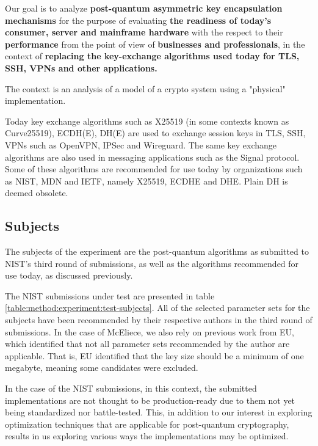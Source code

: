 Our goal is to analyze \textbf{post-quantum asymmetric key encapsulation mechanisms} for the purpose of evaluating \textbf{the readiness of today's consumer, server and mainframe hardware} with the respect to their \textbf{performance} from the point of view of \textbf{businesses and professionals}, in the context of \textbf{replacing the key-exchange algorithms used today for TLS, SSH, VPNs and other applications.}

The context is an analysis of a model of a crypto system using a "physical" implementation.

Today key exchange algorithms such as X25519 (in some contexts known as Curve25519), ECDH(E), DH(E) are used to exchange session keys in TLS, SSH, VPNs such as OpenVPN, IPSec and Wireguard. The same key exchange algorithms are also used in messaging applications such as the Signal protocol. Some of these algorithms are recommended for use today by organizations such as NIST, MDN and IETF, namely X25519, ECDHE and DHE. Plain DH is deemed obsolete.

\subsection{Subjects}

The subjects of the experiment are the post-quantum algorithms as submitted to NIST's third round of submissions, as well as the algorithms recommended for use today, as discussed previously.

The NIST submissions under test are presented in table \ref{table:method:experiment:test-subjects}. All of the selected parameter sets for the subjects have been recommended by their respective authors in the third round of submissions. In the case of McEliece, we also rely on previous work from EU, which identified that not all parameter sets recommended by the author are applicable. That is, EU identified that the key size should be a minimum of one megabyte, meaning some candidates were excluded.

In the case of the NIST submissions, in this context, the submitted implementations are not thought to be production-ready due to them not yet being standardized nor battle-tested. This, in addition to our interest in exploring optimization techniques that are applicable for post-quantum cryptography, results in us exploring various ways the implementations may be optimized.


